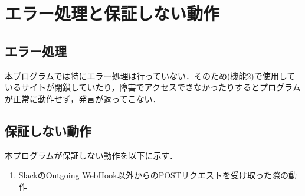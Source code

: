 \documentclass[12pt]{jsarticle}
\begin{document}
\section{エラー処理と保証しない動作}
\subsection{エラー処理}
本プログラムでは特にエラー処理は行っていない．そのため(機能2)で使用しているサイトが閉鎖していたり，障害でアクセスできなかったりするとプログラムが正常に動作せず，発言が返ってこない．

\subsection{保証しない動作}
本プログラムが保証しない動作を以下に示す．
\begin{enumerate}
\item SlackのOutgoing WebHook以外からのPOSTリクエストを受け取った際の動作
\end{enumerate}


%
\end{document}
